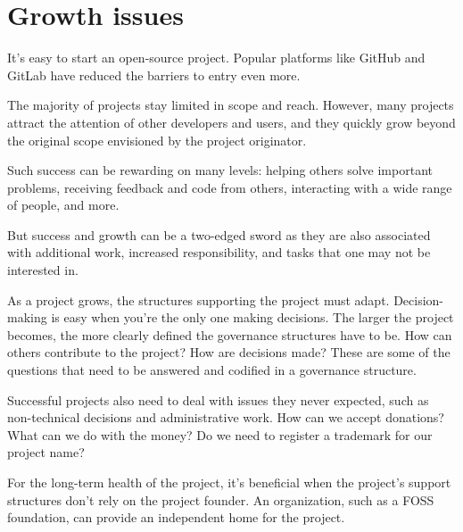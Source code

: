 


\chapter{Growth issues}

It's easy to start an open-source project.  Popular platforms like GitHub and GitLab have reduced the barriers to entry even more.

The majority of projects stay limited in scope and reach.  However, many projects attract the attention of other developers and users, and they quickly grow beyond the original scope envisioned by the project originator.

Such success can be rewarding on many levels: helping others solve important problems, receiving feedback and code from others, interacting with a wide range of people, and more.

But success and growth can be a two-edged sword as they are also associated with additional work, increased responsibility, and tasks that one may not be interested in.

As a project grows, the structures supporting the project must adapt.  Decision-making is easy when you're the only one making decisions.  The larger the project becomes, the more clearly defined the governance structures have to be.  How can others contribute to the project?  How are decisions made?  These are some of the questions that need to be answered and codified in a governance structure.

Successful projects also need to deal with issues they never expected, such as non-technical decisions and administrative work.  How can we accept donations?  What can we do with the money?  Do we need to register a trademark for our project name?

For the long-term health of the project, it's beneficial when the project's support structures don't rely on the project founder.  An organization, such as a FOSS foundation, can provide an independent home for the project.

